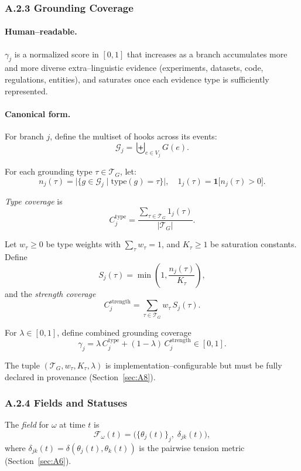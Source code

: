 \documentclass[11pt, a4paper]{article}
\begin{document}
\subsubsection*{A.2.3 \quad Grounding Coverage}
\label{sec:A2gamma}

\paragraph{Human–readable.}
$\gamma_j$ is a normalized score in $[0,1]$ that increases as a branch accumulates more and more diverse extra–linguistic evidence (experiments, datasets, code, regulations, entities), and saturates once each evidence type is sufficiently represented.

\paragraph{Canonical form.}
For branch $j$, define the multiset of hooks across its events:
\[
\mathcal{G}_j = \biguplus_{e \in V_j} G(e).
\]

For each grounding type $\tau \in \mathcal{T}_G$, let:
\[
n_j(\tau) = \bigl|\{g \in \mathcal{G}_j \mid \mathrm{type}(g)=\tau\}\bigr|, \quad
1_j(\tau) = \mathbf{1}\bigl[n_j(\tau) > 0\bigr].
\]

\emph{Type coverage} is
\[
C_j^{\mathrm{type}} = \frac{\sum_{\tau \in \mathcal{T}_G} 1_j(\tau)}{|\mathcal{T}_G|}.
\]

Let $w_\tau \ge 0$ be type weights with $\sum_{\tau} w_\tau = 1$, and $K_\tau \ge 1$ be saturation constants. Define
\[
S_j(\tau) = \min\!\left(1, \frac{n_j(\tau)}{K_\tau}\right),
\]
and the \emph{strength coverage}
\[
C_j^{\mathrm{strength}} = \sum_{\tau \in \mathcal{T}_G} w_\tau\, S_j(\tau).
\]

For $\lambda \in [0,1]$, define combined grounding coverage
\[
\gamma_j = \lambda\, C_j^{\mathrm{type}} + (1-\lambda)\, C_j^{\mathrm{strength}} \in [0,1].
\]

The tuple $(\mathcal{T}_G, w_\tau, K_\tau, \lambda)$ is implementation–configurable but must be fully declared in provenance (Section~\ref{sec:A8}).

\subsubsection*{A.2.4 \quad Fields and Statuses}

The \emph{field} for $\omega$ at time $t$ is
\[
\mathcal{F}_\omega(t) = \bigl(\{\theta_j(t)\}_j,\; \delta_{jk}(t)\bigr),
\]
where $\delta_{jk}(t) = \delta(\theta_j(t), \theta_k(t))$ is the pairwise tension metric (Section~\ref{sec:A6}).
\end{document}
